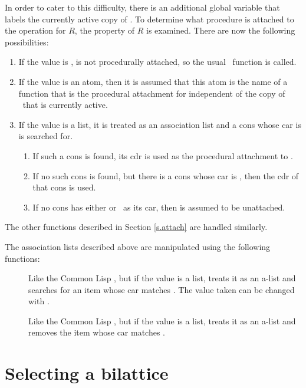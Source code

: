 In order to cater to this difficulty, there is an additional global
variable  that labels the currently active
copy of \mvl.  To determine what procedure is attached to the
 operation for $R$, the  property of $R$ is
examined.  There are now the following possibilities:
 \begin{enumerate}
 \item If the value is \NIL,  is not procedurally attached,
so the usual \mvl\ function is called.
 \item If the value is an atom, then it is assumed that this atom is
the name of a function that is the procedural attachment for 
independent of the copy of \mvl\ that is currently active.
 \item If the value is a list, it is treated as an association list
and a cons whose car is  is searched
for.
 \begin{enumerate}
 \item If such a cons is found, its cdr is used as the procedural
attachment to . 
 \item If no such cons is found, but there is a cons whose car is \T,
then the cdr of that cons is used.
 \item If no cons has either  or \T\ as its
car, then  is assumed to be unattached.
 \end{enumerate}
 \end{enumerate}
 The other functions described in Section \ref{s.attach} are handled
similarly.

The association lists described above are manipulated using the following
functions:
 \begin{description}
 \item []  Like the Common Lisp
, but if the value is a list, treats it as an a-list and
searches for an item whose car matches .
The value taken can be changed with .
 \item [] Like the Common Lisp
, but if the value is a list, treats it as an a-list
and removes the item whose car matches .
 \end{description}

\section{Selecting a bilattice}
\label{s.bilattice}

